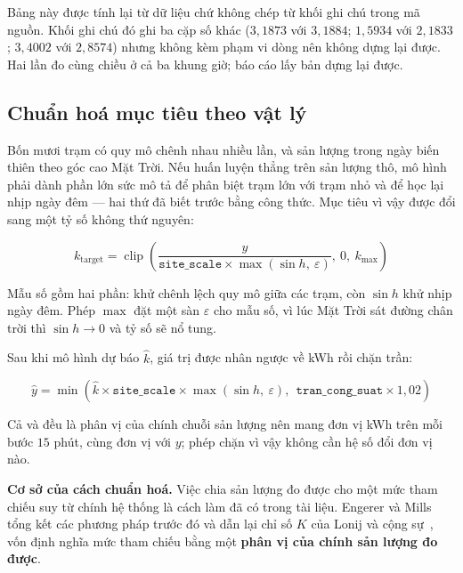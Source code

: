 \documentclass[12pt,a4paper]{article}
\DeclareRobustCommand{\tep}[1]{\texttt{\detokenize{#1}}}
\begin{document}
Bảng này được tính lại từ dữ liệu chứ không chép từ khối ghi chú trong mã nguồn. Khối ghi chú
đó ghi ba cặp số khác ($3{,}1873$ với $3{,}1884$; $1{,}5934$ với $2{,}1833$; $3{,}4002$ với
$2{,}8574$) nhưng không kèm phạm vi dòng nên không dựng lại được. Hai lần đo cùng chiều ở cả ba
khung giờ; báo cáo lấy bản dựng lại được.

\subsection{Chuẩn hoá mục tiêu theo vật lý}

Bốn mươi trạm có quy mô chênh nhau nhiều lần, và sản lượng trong ngày biến thiên theo góc cao
Mặt Trời. Nếu huấn luyện thẳng trên sản lượng thô, mô hình phải dành phần lớn sức mô tả để
phân biệt trạm lớn với trạm nhỏ và để học lại nhịp ngày đêm --- hai thứ đã biết trước bằng
công thức. Mục tiêu vì vậy được đổi sang một tỷ số không thứ nguyên:

\begin{equation}
k_{\text{target}} = \operatorname{clip}\!\left(
\frac{y}{\texttt{site\_scale} \times \max(\sin h,\ \varepsilon)},\ 0,\ k_{\max}\right)
\end{equation}

Mẫu số gồm hai phần: \tep{site_scale} khử chênh lệch quy mô giữa các trạm, còn $\sin h$ khử
nhịp ngày đêm. Phép $\max$ đặt một sàn $\varepsilon$ cho mẫu số, vì lúc Mặt Trời sát đường
chân trời thì $\sin h \to 0$ và tỷ số sẽ nổ tung.

Sau khi mô hình dự báo $\hat{k}$, giá trị được nhân ngược về kWh rồi chặn trần:

\begin{equation}
\hat{y} = \min\!\left(
\hat{k} \times \texttt{site\_scale} \times \max(\sin h,\ \varepsilon),\ \
\texttt{tran\_cong\_suat} \times 1{,}02\right)
\end{equation}

Cả \tep{site_scale} và \tep{tran_cong_suat} đều là phân vị của chính chuỗi sản lượng nên
mang đơn vị kWh trên mỗi bước $15$ phút, cùng đơn vị với $y$; phép chặn vì vậy không cần hệ số
đổi đơn vị nào.

\textbf{Cơ sở của cách chuẩn hoá.} Việc chia sản lượng đo được cho một mức tham chiếu suy từ
chính hệ thống là cách làm đã có trong tài liệu. Engerer và Mills~\cite{engerer2014kpv} tổng
kết các phương pháp trước đó và dẫn lại chỉ số $K$ của Lonij và cộng sự~\cite{lonij2012tucson},
vốn định nghĩa mức tham chiếu bằng một \textbf{phân vị của chính sản lượng đo được}.
\end{document}
